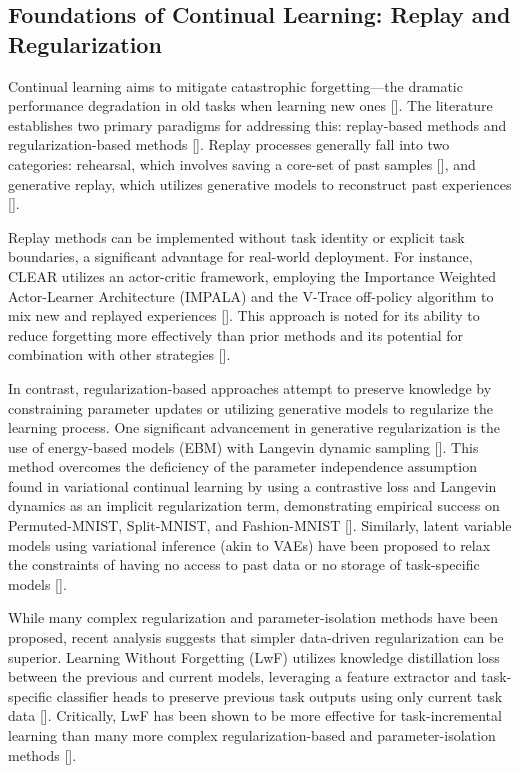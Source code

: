\documentclass[11pt]{article}
\begin{document}
\subsection{Foundations of Continual Learning: Replay and Regularization}

Continual learning aims to mitigate catastrophic forgetting—the dramatic performance degradation in old tasks when learning new ones [\citep{2302.00487}]. The literature establishes two primary paradigms for addressing this: replay-based methods and regularization-based methods [\citep{2007.00487}]. Replay processes generally fall into two categories: rehearsal, which involves saving a core-set of past samples [\citep{2007.00487}], and generative replay, which utilizes generative models to reconstruct past experiences [\citep{2007.00487}].

Replay methods can be implemented without task identity or explicit task boundaries, a significant advantage for real-world deployment. For instance, CLEAR utilizes an actor-critic framework, employing the Importance Weighted Actor-Learner Architecture (IMPALA) and the V-Trace off-policy algorithm to mix new and replayed experiences [\citep{1811.11682}]. This approach is noted for its ability to reduce forgetting more effectively than prior methods and its potential for combination with other strategies [\citep{1811.11682}].

In contrast, regularization-based approaches attempt to preserve knowledge by constraining parameter updates or utilizing generative models to regularize the learning process. One significant advancement in generative regularization is the use of energy-based models (EBM) with Langevin dynamic sampling [\citep{1912.01238}]. This method overcomes the deficiency of the parameter independence assumption found in variational continual learning by using a contrastive loss and Langevin dynamics as an implicit regularization term, demonstrating empirical success on Permuted-MNIST, Split-MNIST, and Fashion-MNIST [\citep{1912.01238}]. Similarly, latent variable models using variational inference (akin to VAEs) have been proposed to relax the constraints of having no access to past data or no storage of task-specific models [\citep{1810.10612}].

While many complex regularization and parameter-isolation methods have been proposed, recent analysis suggests that simpler data-driven regularization can be superior. Learning Without Forgetting (LwF) utilizes knowledge distillation loss between the previous and current models, leveraging a feature extractor and task-specific classifier heads to preserve previous task outputs using only current task data [\citep{2107.12304}]. Critically, LwF has been shown to be more effective for task-incremental learning than many more complex regularization-based and parameter-isolation methods [\citep{2107.12304}].
\end{document}
